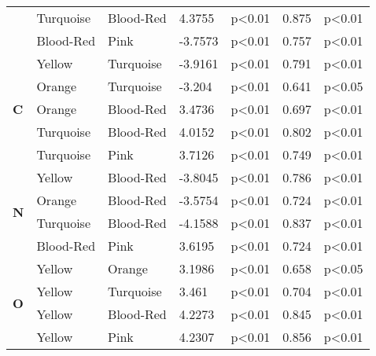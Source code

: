 \begin{longtable}{ |p{0.5cm}| p{1.9cm}|p{1.9cm}|p{1.2cm}| p{1.7cm}|p{1cm}|p{1.5cm}|  }
    &Turquoise	&Blood-Red			&4.3755			&p<0.01			&0.875  		&p<0.01\\
    &Blood-Red	&Pink				&-3.7573			&p<0.01			& 0.757		&p<0.01\\
    \hline
    \hline
    \multirow{5}{*}{\textbf{C}}
    &Yellow		&Turquoise			&-3.9161			&p<0.01			&0.791 		&p<0.01\\
    &Orange		&Turquoise			&-3.204			&p<0.01			& 0.641		&p<0.05\\
    &Orange		&Blood-Red			&3.4736			&p<0.01			&0.697 		&p<0.01\\
    &Turquoise	&Blood-Red			&4.0152			&p<0.01			& 0.802		&p<0.01\\
    &Turquoise	&Pink				&3.7126			&p<0.01			& 0.749		&p<0.01\\
    \hline
    \hline
    \multirow{4}{*}{\textbf{N}}
    &Yellow		&Blood-Red			&-3.8045			&p<0.01			&0.786 		&p<0.01\\
    &Orange		&Blood-Red			&-3.5754			&p<0.01			&0.724 		&p<0.01\\
    &Turquoise		&Blood-Red		&-4.1588			&p<0.01			&0.837 		&p<0.01\\
    &Blood-Red		&Pink			&3.6195			&p<0.01			&0.724 		&p<0.01\\

    \hline
    \hline
    \multirow{4}{*}{\textbf{O}}
    &Yellow		&Orange			&3.1986			&p<0.01			&0.658 		&p<0.05\\
    &Yellow		&Turquoise			&3.461		&p<0.01			&0.704 		&p<0.01\\
    &Yellow		&Blood-Red			&4.2273		&p<0.01			&0.845 		&p<0.01\\
    &Yellow		&Pink			&4.2307			&p<0.01			&0.856 		&p<0.01\\
    \hline
\end{longtable}

